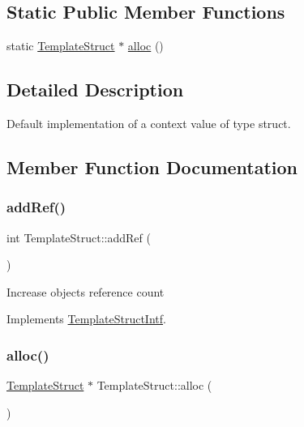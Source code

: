 \subsection*{Static Public Member Functions}
\begin{DoxyCompactItemize}
\item 
static \mbox{\hyperlink{class_template_struct}{Template\+Struct}} $\ast$ \mbox{\hyperlink{class_template_struct_ac2822e406f00ab1dde962fff3980d2c6}{alloc}} ()
\end{DoxyCompactItemize}


\subsection{Detailed Description}
Default implementation of a context value of type struct. 

\subsection{Member Function Documentation}
\mbox{\label{class_template_struct_a3fc49f671cd0c2d963f50977f3842541}} 
\subsubsection{\texorpdfstring{addRef()}{addRef()}}
{\footnotesize\ttfamily int Template\+Struct\+::add\+Ref (\begin{DoxyParamCaption}{ }\end{DoxyParamCaption})\hspace{0.3cm}{\ttfamily [virtual]}}

Increase object\textquotesingle{}s reference count 

Implements \mbox{\hyperlink{class_template_struct_intf_a05fe97ad47633beb326f69686faed581}{Template\+Struct\+Intf}}.

\mbox{\label{class_template_struct_ac2822e406f00ab1dde962fff3980d2c6}} 
\subsubsection{\texorpdfstring{alloc()}{alloc()}}
{\footnotesize\ttfamily \mbox{\hyperlink{class_template_struct}{Template\+Struct}} $\ast$ Template\+Struct\+::alloc (\begin{DoxyParamCaption}{ }\end{DoxyParamCaption})\hspace{0.3cm}{\ttfamily [static]}}

